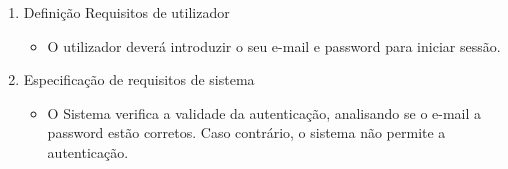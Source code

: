 \begin{enumerate}
    \item Definição Requisitos de utilizador
    \begin{itemize}
        \item O utilizador deverá introduzir o seu e-mail e password para iniciar sessão.
    \end{itemize}
    \item Especificação de requisitos de sistema
    \begin{itemize}
        \item O Sistema verifica a validade da autenticação, analisando se o e-mail a password estão corretos. Caso contrário, o sistema não permite a autenticação.
    \end{itemize}
\end{enumerate}